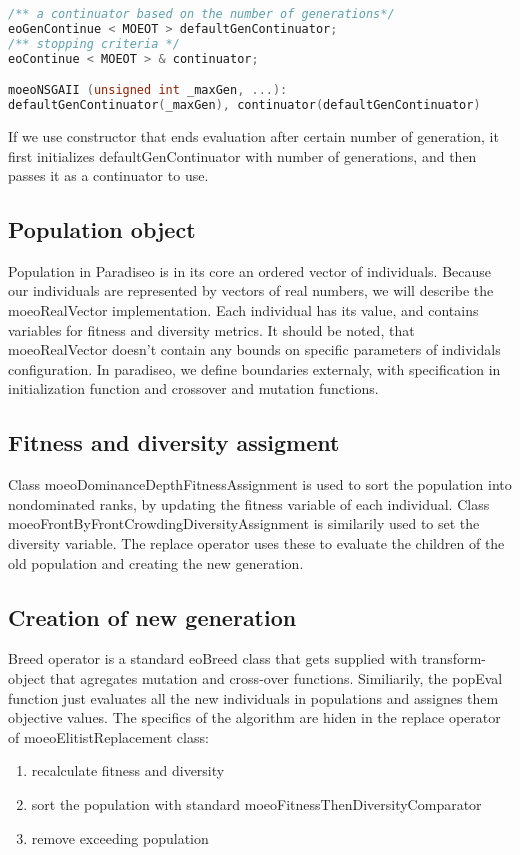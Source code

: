 \documentclass[12pt,oneside]{fithesis2}
\begin{document}
\begin{lstlisting}[language=C++,label=composition,caption=Object composition in Paradiseo]
/** a continuator based on the number of generations*/
eoGenContinue < MOEOT > defaultGenContinuator;
/** stopping criteria */
eoContinue < MOEOT > & continuator;

moeoNSGAII (unsigned int _maxGen, ...):
defaultGenContinuator(_maxGen), continuator(defaultGenContinuator)
\end{lstlisting}

If we use constructor that ends evaluation after certain number of generation, it first initializes defaultGenContinuator with number of generations, and then passes it as a continuator to use. 

\subsection{Population object}
Population in Paradiseo is in its core an ordered vector of individuals. Because our individuals are represented by vectors of real numbers, we will describe the moeoRealVector implementation. Each individual has its value, and contains variables for fitness and diversity metrics. It should be noted, that moeoRealVector doesn't contain any bounds on specific parameters of individals configuration. In paradiseo, we define boundaries externaly, with specification in initialization function and crossover and mutation functions. 

\subsection{Fitness and diversity assigment}

Class moeoDominanceDepthFitnessAssignment is used to sort the population into nondominated ranks, by updating the fitness variable of each individual. Class moeoFrontByFrontCrowdingDiversityAssignment is similarily used to set the diversity variable. The replace operator uses these to evaluate the children of the old population and creating the new generation.

\subsection{Creation of new generation}

Breed operator is a standard eoBreed class that gets supplied with transform-object that agregates mutation and cross-over functions. Similiarily, the popEval function just evaluates all the new individuals in populations and assignes them objective values. The specifics of the algorithm are hiden in the replace operator of moeoElitistReplacement class:
\begin{enumerate}
\item recalculate fitness and diversity
\item sort the population with standard moeoFitnessThenDiversityComparator
\item remove exceeding population
\end{enumerate}
\end{document}
